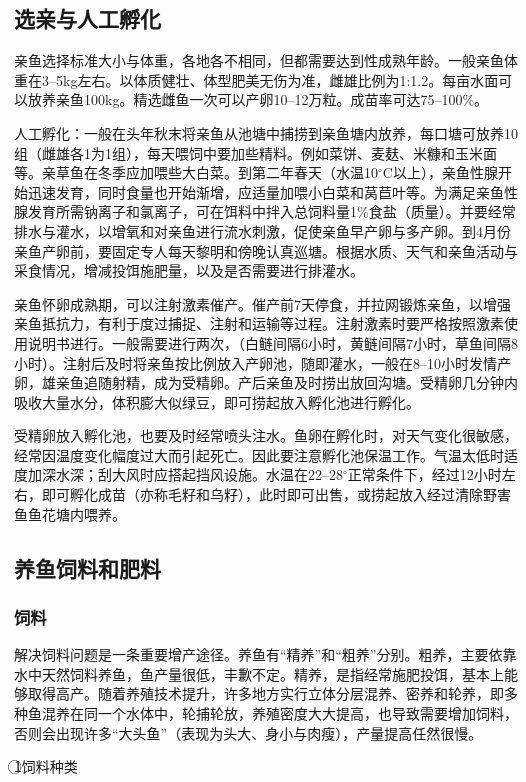 \documentclass{ctexbook}
\begin{document}
\subsection{选亲与人工孵化}
亲鱼选择标准大小与体重，各地各不相同，但都需要达到性成熟年龄。一般亲鱼体重在3--5kg左右。以体质健壮、体型肥美无伤为准，雌雄比例为1:1.2。每亩水面可以放养亲鱼100kg。精选雌鱼一次可以产卵10--12万粒。成苗率可达75--100\%。

人工孵化：一般在头年秋末将亲鱼从池塘中捕捞到亲鱼塘内放养，每口塘可放养10组（雌雄各1为1组），每天喂饲中要加些精料。例如菜饼、麦麸、米糠和玉米面等。亲草鱼在冬季应加喂些大白菜。到第二年春天（水温10$^{\circ}$C以上），亲鱼性腺开始迅速发育，同时食量也开始渐增，应适量加喂小白菜和莴苣叶等。为满足亲鱼性腺发育所需钠离子和氯离子，可在饵料中拌入总饲料量1\%食盐（质量）。并要经常排水与灌水，以增氧和对亲鱼进行流水刺激，促使亲鱼早产卵与多产卵。到4月份亲鱼产卵前，要固定专人每天黎明和傍晚认真巡塘。根据水质、天气和亲鱼活动与采食情况，增减投饵施肥量，以及是否需要进行排灌水。

亲鱼怀卵成熟期，可以注射激素催产。催产前7天停食，并拉网锻炼亲鱼，以增强亲鱼抵抗力，有利于度过捕捉、注射和运输等过程。注射激素时要严格按照激素使用说明书进行。一般需要进行两次，（白鲢间隔6小时，黄鲢间隔7小时，草鱼间隔8小时）。注射后及时将亲鱼按比例放入产卵池，随即灌水，一般在8--10小时发情产卵，雄亲鱼追随射精，成为受精卵。产后亲鱼及时捞出放回沟塘。受精卵几分钟内吸收大量水分，体积膨大似绿豆，即可捞起放入孵化池进行孵化。

受精卵放入孵化池，也要及时经常喷头注水。鱼卵在孵化时，对天气变化很敏感，经常因温度变化幅度过大而引起死亡。因此要注意孵化池保温工作。气温太低时适度加深水深；刮大风时应搭起挡风设施。水温在22--28$^\circ$正常条件下，经过12小时左右，即可孵化成苗（亦称毛籽和乌籽），此时即可出售，或捞起放入经过清除野害鱼鱼花塘内喂养。
\subsection{养鱼饲料和肥料}
\subsubsection{饲料}
解决饲料问题是一条重要增产途径。养鱼有“精养”和“粗养”分别。粗养，主要依靠水中天然饲料养鱼，鱼产量很低，丰歉不定。精养，是指经常施肥投饵，基本上能够取得高产。随着养殖技术提升，许多地方实行立体分层混养、密养和轮养，即多种鱼混养在同一个水体中，轮捕轮放，养殖密度大大提高，也导致需要增加饲料，否则会出现许多“大头鱼”（表现为头大、身小与肉瘦），产量提高任然很慢。

\textcircled{1}饲料种类
\end{document}
